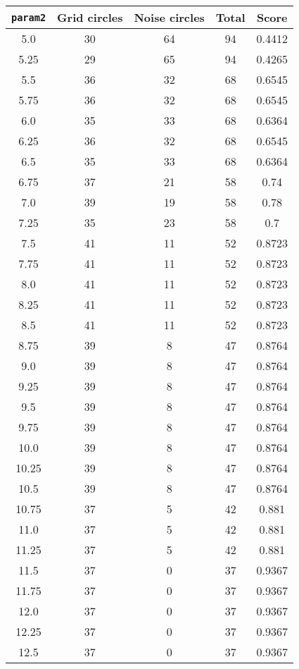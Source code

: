 \documentclass[letterpaper, 12pt]{article}
\begin{document}
\begin{longtable}{|c|c|c|c|c|}
\hline
\textbf{\texttt{param2}} & \textbf{Grid circles} & \textbf{Noise circles} & \textbf{Total} & \textbf{Score} \\
\hline
5.0 & 30 & 64 & 94 & 0.4412 \\
\hline
5.25 & 29 & 65 & 94 & 0.4265 \\
\hline
5.5 & 36 & 32 & 68 & 0.6545 \\
\hline
5.75 & 36 & 32 & 68 & 0.6545 \\
\hline
6.0 & 35 & 33 & 68 & 0.6364 \\
\hline
6.25 & 36 & 32 & 68 & 0.6545 \\
\hline
6.5 & 35 & 33 & 68 & 0.6364 \\
\hline
6.75 & 37 & 21 & 58 & 0.74 \\
\hline
7.0 & 39 & 19 & 58 & 0.78 \\
\hline
7.25 & 35 & 23 & 58 & 0.7 \\
\hline
7.5 & 41 & 11 & 52 & 0.8723 \\
\hline
7.75 & 41 & 11 & 52 & 0.8723 \\
\hline
8.0 & 41 & 11 & 52 & 0.8723 \\
\hline
8.25 & 41 & 11 & 52 & 0.8723 \\
\hline
8.5 & 41 & 11 & 52 & 0.8723 \\
\hline
8.75 & 39 & 8 & 47 & 0.8764 \\
\hline
9.0 & 39 & 8 & 47 & 0.8764 \\
\hline
9.25 & 39 & 8 & 47 & 0.8764 \\
\hline
9.5 & 39 & 8 & 47 & 0.8764 \\
\hline
9.75 & 39 & 8 & 47 & 0.8764 \\
\hline
10.0 & 39 & 8 & 47 & 0.8764 \\
\hline
10.25 & 39 & 8 & 47 & 0.8764 \\
\hline
10.5 & 39 & 8 & 47 & 0.8764 \\
\hline
10.75 & 37 & 5 & 42 & 0.881 \\
\hline
11.0 & 37 & 5 & 42 & 0.881 \\
\hline
11.25 & 37 & 5 & 42 & 0.881 \\
\hline
11.5 & 37 & 0 & 37 & 0.9367 \\
\hline
11.75 & 37 & 0 & 37 & 0.9367 \\
\hline
12.0 & 37 & 0 & 37 & 0.9367 \\
\hline
12.25 & 37 & 0 & 37 & 0.9367 \\
\hline
12.5 & 37 & 0 & 37 & 0.9367 \\

\end{longtable}
\end{document}
